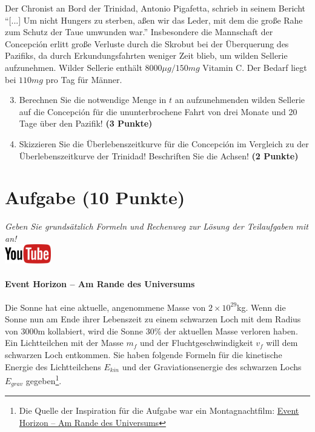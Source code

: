 \documentclass[a4paper, 9pt]{scrartcl}\usepackage[]{graphicx}\usepackage[]{xcolor}
\begin{document}
Der Chronist an Bord der Trinidad, Antonio Pigafetta, schrieb in seinem
Bericht "`[...] Um nicht Hungers zu sterben, a{\ss}en wir das Leder, mit dem
die gro{\ss}e Rahe zum Schutz der Taue umwunden war."' Insbesondere die
Mannschaft der Concepci{\'o}n erlitt gro{\ss}e Verluste durch die Skrobut bei der
{\"U}berquerung des Pazifiks, da durch Erkundungsfahrten weniger Zeit blieb, um
wilden Sellerie aufzunehmen. Wilder Sellerie enth{\"a}lt
$8000\mu g/150mg$ Vitamin C. Der Bedarf liegt bei
$110mg$ pro Tag f{\"u}r M{\"a}nner.

\begin{enumerate}
  \setcounter{enumi}{2}
\item Berechnen Sie die notwendige Menge in $t$ an
  aufzunehmenden wilden Sellerie auf die Concepci{\'o}n f{\"u}r die ununterbrochene
  Fahrt von drei Monate und 20 Tage {\"u}ber den Pazifik!
  \textbf{(3 Punkte)}
\item Skizzieren Sie die {\"U}berlebenszeitkurve f{\"u}r die Concepci{\'o}n im
  Vergleich zu der {\"U}berlebenszeitkurve der Trinidad! Beschriften Sie die
  Achsen! \textbf{(2 Punkte)}
\end{enumerate}

 
\clearpage

\section{Aufgabe \hfill (10 Punkte)}

\textit{Geben Sie grunds{\"a}tzlich Formeln und Rechenweg zur L{\"o}sung der
  Teilaufgaben mit an!} \\[1Ex]

\hfill\href{https://youtu.be/q-qYK4Chslg}{\includegraphics[width =
  2cm]{img/youtube}} %
\hspace{2Ex}

\paragraph{Event Horizon -- Am Rande des Universums}



Die Sonne hat eine aktuelle, angenommene Masse von $\ensuremath{2\times 10^{29}}$kg. Wenn
die Sonne nun am Ende ihrer Lebenszeit zu einem schwarzen Loch mit dem
Radius von $3000$m kollabiert, wird die Sonne $30$\%
der aktuellen Masse verloren haben. Ein Lichtteilchen mit der Masse $m_f$
und der Fluchtgeschwindigkeit $v_f$ will dem schwarzen Loch entkommen.  Sie
haben folgende Formeln f{\"u}r die kinetische Energie des Lichtteilchens
$E_{kin}$ und der Graviationsenergie des schwarzen Lochs $E_{grav}$
gegeben\footnote{Die Quelle der Inspiration
  für die Aufgabe war ein Montagnachtfilm:
  \href{https://de.wikipedia.org/wiki/Event_Horizon_–_Am_Rande_des_Universums}{Event Horizon – Am Rande des Universums}}.
\end{document}
